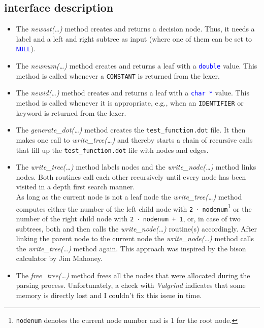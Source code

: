 \documentclass{scrartcl}
\begin{document}
\subsection*{interface description}
\begin{itemize}

\item The \textit{newast(\ldots)} method creates and returns a decision node. Thus, it needs a label and a left and right subtree as input (where one of them can be set to \texttt{\textcolor{blue}{NULL}}).

\item The \textit{newnum(\ldots)} method creates and returns a leaf with a \texttt{\textcolor{blue}{double}} value. This method is called whenever a \texttt{CONSTANT} is returned from the lexer.

\item The \textit{newid(\ldots)} method creates and returns a leaf with a \texttt{\textcolor{blue}{char *}} value. This method is called whenever it is appropriate, e.g., when an \texttt{IDENTIFIER} or keyword is returned from the lexer.

\item The \textit{generate\_dot(\ldots)} method creates the \texttt{test\_function.dot} file. It then makes one call to \textit{write\_tree(\ldots)} and thereby starts a chain of recursive calls that fill up the \texttt{test\_function.dot} file with nodes and edges.

\item The \textit{write\_tree(\ldots)} method labels nodes and the \textit{write\_node(\ldots)} method links nodes. Both routines call each other recursively until every node has been visited in a depth first search manner.\\
As long as the current node is not a leaf node the \textit{write\_tree(\ldots)} method computes either the number of the left child node with \texttt{2 $\cdot$ nodenum}\footnote{\texttt{nodenum} denotes the current node number and is 1 for the root node.} or the number of the right child node with \texttt{2 $\cdot$ nodenum + 1}, or, in case of two subtrees, both and then calls the \textit{write\_node(\ldots)} routine(s) accordingly. After linking the parent node to the current node the \textit{write\_node(\ldots)} method calls the \textit{write\_tree(\ldots)} method again. This approach was inspired by the bison calculator by Jim Mahoney\cite{calc}.

\item The \textit{free\_tree(\ldots)} method frees all the nodes that were allocated during the parsing process. Unfortunately, a check with \textit{Valgrind} indicates that some memory is directly lost and I couldn't fix this issue in time.

\end{itemize}
\end{document}
